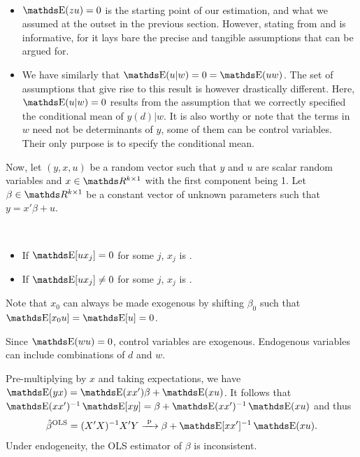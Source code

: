 \documentclass[letterpaper, 10pt]{article}
\DeclareMathOperator{\OLS}{OLS}
\begin{document}
\begin{remark}~
  \begin{itemize}
    \item \(\E(zu) = 0\) is the starting point of our estimation, and what we assumed at the outset in the previous section.
    However, stating from  and  is informative, for it lays bare the precise and tangible assumptions that can be argued for.
    \item We have similarly that \(\E(u|w) = 0 = \E(uw)\).
      The set of assumptions that give rise to this result is however drastically different.
      Here, \(\E(u|w) = 0\) results from the assumption that we correctly specified the conditional mean of \(y(d) | w\).
      It is also worthy or note that the terms in \(w\) need not be determinants of \(y\), some of them can be control variables.
      Their only purpose is to specify the conditional mean.
  \end{itemize}
\end{remark}


Now, let \((y, x, u)\) be a random vector such that \(y\) and \(u\) are scalar random variables and \(x \in \RR^{k \times 1}\) with the first component being 1.
Let \(\beta \in \RR^{k \times 1}\) be a constant vector of unknown parameters such that \(y = x' \beta + u\).

\begin{definition}~
  \begin{itemize}
    \item If \(\E[u x_j] = 0\) for some \(j\), \(x_j\) is .
    \item If \(\E[u x_j] \neq 0\) for some \(j\), \(x_j\) is .
  \end{itemize}
  Note that \(x_0\) can always be made exogenous by shifting \(\beta_0\) such that \(\E[x_0 u] = \E[u] = 0\).
\end{definition}
\begin{example}
  Since \(\E(wu) = 0\), control variables are exogenous.
  Endogenous variables can include combinations of \(d\) and \(w\).
\end{example}

Pre-multiplying by \(x\) and taking expectations, we have \(\E(y x) = \E(x x') \beta + \E(xu)\).
It follows that \(\E(xx')^{-1} \E[xy] = \beta + \E(xx')^{-1} \E(xu)\) and thus
\[
  \hat{\beta}^{\OLS}
  = (X'X)^{-1} X'Y
  \longprobto \beta + \E[xx']^{-1} \E(xu).
\]
Under endogeneity, the OLS estimator of \(\beta\) is inconsistent.
\end{document}
